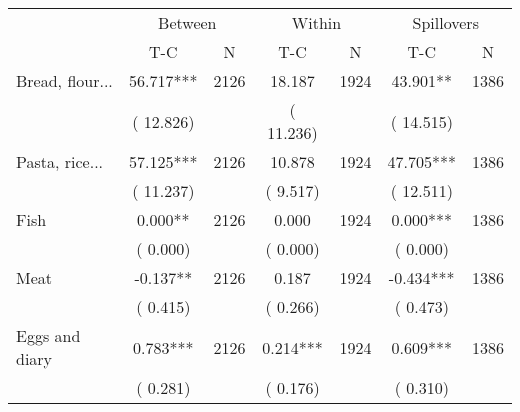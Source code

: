 
\begin{tabular}{l*{6}{c}}\hline&\multicolumn{2}{c}{Between}&\multicolumn{2}{c}{Within}&\multicolumn{2}{c}{Spillovers} \\ \cmidrule(r){2-3}\cmidrule(l){4-5}\cmidrule(l){6-7} & {T-C} & {N} & {T-C} & {N}  & {T-C}  & {N}  \\ \midrule
Bread, flour...        &             56.717***      &       2126       &             18.187      &       1924       &             43.901**      &       1386       \\
                       &       (      12.826)            &                               &       (      11.236)            &                               &       (      14.515)            &                               \\
Pasta, rice...        &             57.125***      &       2126       &             10.878      &       1924       &             47.705***      &       1386       \\
                       &       (      11.237)            &                               &       (       9.517)            &                               &       (      12.511)            &                               \\
Fish        &              0.000**      &       2126       &              0.000      &       1924       &              0.000***      &       1386       \\
                       &       (       0.000)            &                               &       (       0.000)            &                               &       (       0.000)            &                               \\
Meat        &             -0.137**      &       2126       &              0.187      &       1924       &             -0.434***      &       1386       \\
                       &       (       0.415)            &                               &       (       0.266)            &                               &       (       0.473)            &                               \\
Eggs and diary        &              0.783***      &       2126       &              0.214***      &       1924       &              0.609***      &       1386       \\
                       &       (       0.281)            &                               &       (       0.176)            &                               &       (       0.310)            &                               \\

\end{tabular}
